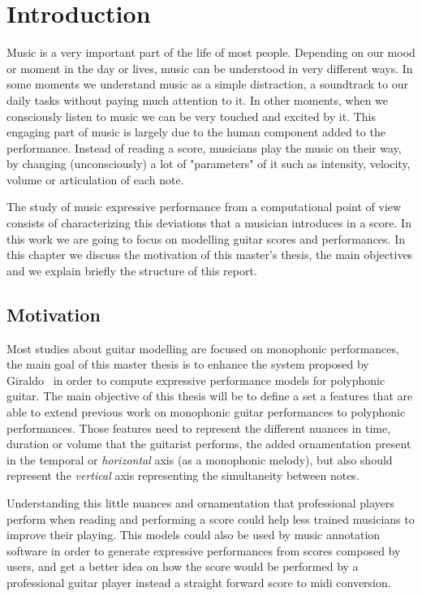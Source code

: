 \normallinespacing

\chapter{Introduction}


\label{chap:introduction}
Music is a very important part of the life of most people. Depending on our mood or moment in the day or lives, music can be understood in very different ways. In some moments we understand music as a simple distraction, a soundtrack to our daily tasks without paying much attention to it. In other moments, when we consciously listen to music we can be very touched and excited by it. This engaging part of music is largely due to the human component added to the performance. Instead of reading a score, musicians play the music on their way, by changing (unconsciously) a lot of "parameters" of it such as intensity, velocity, volume or articulation of each note. 

The study of music expressive performance from a computational point of view consists of characterizing this deviations that a musician introduces in a score. In this work we are going to focus on modelling guitar scores and performances. In this chapter we discuss the motivation of this master's thesis, the main objectives and we explain briefly the structure of this report.

\section{Motivation}
Most studies about guitar modelling are focused on monophonic performances, the main goal of this master thesis is to enhance the system proposed by Giraldo~\cite{Giraldo2016} in order to compute expressive performance models for polyphonic guitar. The main objective of this thesis will be to define a set a features that are able to extend previous work on monophonic guitar performances to polyphonic performances. Those features need to represent the different nuances in time, duration or volume that the guitarist performs, the added ornamentation present in the temporal or \textit{horizontal} axis (as a monophonic melody), but also should represent the \textit{vertical} axis representing the simultaneity between notes.

Understanding this little nuances and ornamentation that professional players perform when reading and performing a score could help less trained musicians to improve their playing. This models could also be used by music annotation software in order to generate expressive performances from scores composed by users, and get a better idea on how the score would be performed by a professional guitar player instead a straight forward score to midi conversion.

